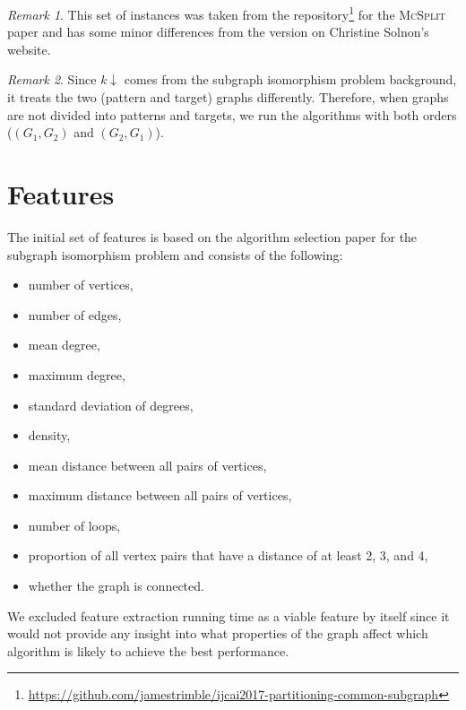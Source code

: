 \documentclass{article}
\theoremstyle{definition}
\theoremstyle{remark}
\newtheorem{remark}{Remark}[section]
\begin{document}
\begin{remark}
This set of instances was taken from the
repository\footnote{\url{https://github.com/jamestrimble/ijcai2017-partitioning-common-subgraph}}
for the \textsc{McSplit} paper \cite{DBLP:conf/ijcai/McCreeshPT17} and has some
minor differences from the version on Christine Solnon's website.
\end{remark}

\begin{remark}
  Since $k\downarrow$ comes from the subgraph isomorphism problem background, it
  treats the two (pattern and target) graphs differently. Therefore, when graphs
  are not divided into patterns and targets, we run the algorithms with both
  orders ($(G_1, G_2)$ and $(G_2, G_1)$).
\end{remark}

\section{Features}
The initial set of features is based on the algorithm selection paper for the
subgraph isomorphism problem \cite{DBLP:conf/lion/KotthoffMS16} and consists of
the following:

\begin{itemize}
\item number of vertices,
\item number of edges,
\item mean degree,
\item maximum degree,
\item standard deviation of degrees,
\item density,
\item mean distance between all pairs of vertices,
\item maximum distance between all pairs of vertices,
\item number of loops,
\item proportion of all vertex pairs that have a distance of at least 2, 3, and 4,
\item whether the graph is connected.
\end{itemize}

We excluded feature extraction running time as a viable feature by itself since
it would not provide any insight into what properties of the graph affect which
algorithm is likely to achieve the best performance.
\end{document}
